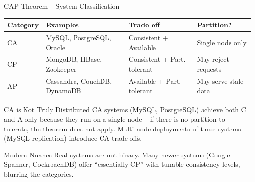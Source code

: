 \begin{frame}{CAP Theorem -- System Classification}
  \begin{center}
  \renewcommand{\arraystretch}{1.35}
  \begin{tabularx}{\linewidth}{@{}llXl@{}}
    \toprule
    \textbf{Category} & \textbf{Examples} & \textbf{Trade-off} & \textbf{Partition?} \\
    \midrule
    CA & MySQL, PostgreSQL, Oracle & Consistent + Available & Single node only \\
    CP & MongoDB, HBase, Zookeeper & Consistent + Part.-tolerant & May reject requests \\
    AP & Cassandra, CouchDB, DynamoDB & Available + Part.-tolerant & May serve stale data \\
    \bottomrule
  \end{tabularx}
  \end{center}

  \begin{alertblock}{CA is Not Truly Distributed}
    CA systems (MySQL, PostgreSQL) achieve both C and A only because they run on a single node
    -- if there is no partition to tolerate, the theorem does not apply. Multi-node deployments
    of these systems (MySQL replication) introduce CA trade-offs.
  \end{alertblock}

  \begin{block}{Modern Nuance}
    Real systems are not binary. Many newer systems (Google Spanner, CockroachDB) offer
    ``essentially CP'' with tunable consistency levels, blurring the categories.
  \end{block}
\end{frame}

